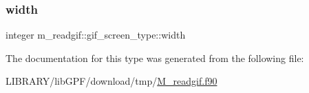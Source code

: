 \mbox{\label{structm__readgif_1_1gif__screen__type_adea440e7648df26d475a1c1531108a29}} 
\subsubsection{\texorpdfstring{width}{width}}
{\footnotesize\ttfamily integer m\+\_\+readgif\+::gif\+\_\+screen\+\_\+type\+::width}



The documentation for this type was generated from the following file\+:\begin{DoxyCompactItemize}
\item 
L\+I\+B\+R\+A\+R\+Y/lib\+G\+P\+F/download/tmp/\hyperlink{M__readgif_8f90}{M\+\_\+readgif.\+f90}\end{DoxyCompactItemize}
